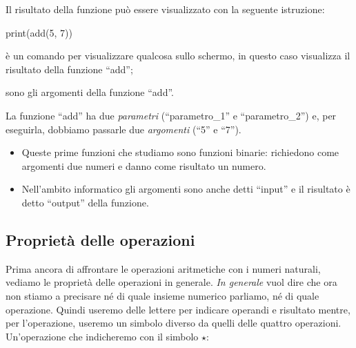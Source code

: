 Il risultato della funzione può essere visualizzato con la seguente 
istruzione:
\begin{Piton}
print(add(5, 7))
\end{Piton}
\begin{description} [nosep]
\item [\textbf{``print''}] è un comando per visualizzare qualcosa sullo 
schermo, in questo caso visualizza il risultato della funzione ``add'';
\item [\textbf{``5'' e ``7''}] sono gli argomenti della funzione ``add''. 
\end{description}
La funzione ``add'' ha due \emph{parametri} 
(``parametro\_1'' e ``parametro\_2'') e, per eseguirla, 
dobbiamo passarle due \emph{argomenti} (``5'' e ``7'').

\begin{osservazioni}{}{}
\begin{itemize} [nosep]
\item Queste prime funzioni che studiamo sono funzioni binarie: richiedono 
come argomenti due numeri e danno come risultato un numero.
\item Nell'ambito informatico gli argomenti sono anche detti ``input'' e il 
risultato è detto ``output'' della funzione.
\end{itemize}
\end{osservazioni}

\subsection{Proprietà delle operazioni}

Prima ancora di affrontare le operazioni aritmetiche con i numeri naturali, 
vediamo le proprietà delle operazioni in generale. \emph{In generale} vuol 
dire che ora non stiamo a precisare né di quale insieme numerico parliamo, 
né di quale operazione. Quindi useremo delle lettere per indicare  
operandi e  risultato mentre, per l'operazione, useremo un simbolo diverso 
da quelli delle quattro operazioni. Un'operazione che indicheremo con il 
simbolo \(\star\):

